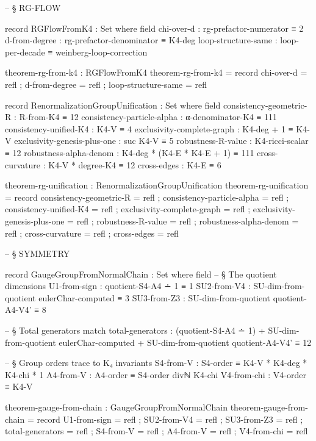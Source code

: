 \documentclass[11pt,a4paper]{book}
\begin{document}
\begin{code}
-- § RG-FLOW

record RGFlowFromK4 : Set where
  field
    chi-over-d           : rg-prefactor-numerator ≡ 2
    d-from-degree        : rg-prefactor-denominator ≡ K4-deg
    loop-structure-same  : loop-per-decade ≡ weinberg-loop-correction

theorem-rg-from-k4 : RGFlowFromK4
theorem-rg-from-k4 = record
  { chi-over-d          = refl
  ; d-from-degree       = refl
  ; loop-structure-same = refl
  }

record RenormalizationGroupUnification : Set where
  field
    consistency-geometric-R : R-from-K4 ≡ 12
    consistency-particle-alpha : α-denominator-K4 ≡ 111
    consistency-unified-K4 : K4-V ≡ 4
    exclusivity-complete-graph : K4-deg + 1 ≡ K4-V
    exclusivity-genesis-plus-one : suc K4-V ≡ 5
    robustness-R-value : K4-ricci-scalar ≡ 12
    robustness-alpha-denom : K4-deg * (K4-E * K4-E + 1) ≡ 111
    cross-curvature : K4-V * degree-K4 ≡ 12
    cross-edges : K4-E ≡ 6

theorem-rg-unification : RenormalizationGroupUnification
theorem-rg-unification = record
  { consistency-geometric-R = refl
  ; consistency-particle-alpha = refl
  ; consistency-unified-K4 = refl
  ; exclusivity-complete-graph = refl
  ; exclusivity-genesis-plus-one = refl
  ; robustness-R-value = refl
  ; robustness-alpha-denom = refl
  ; cross-curvature = refl
  ; cross-edges = refl
  }


-- § SYMMETRY

record GaugeGroupFromNormalChain : Set where
  field
    -- § The quotient dimensions
    U1-from-sign   : quotient-S4-A4 ∸ 1 ≡ 1
    SU2-from-V4    : SU-dim-from-quotient eulerChar-computed ≡ 3
    SU3-from-Z3    : SU-dim-from-quotient quotient-A4-V4' ≡ 8
    
    -- § Total generators match
    total-generators : (quotient-S4-A4 ∸ 1) 
                     + SU-dim-from-quotient eulerChar-computed 
                     + SU-dim-from-quotient quotient-A4-V4' ≡ 12
    
    -- § Group orders trace to K₄ invariants
    S4-from-V     : S4-order ≡ K4-V * K4-deg * K4-chi * 1
    A4-from-V     : A4-order ≡ S4-order divℕ K4-chi
    V4-from-chi   : V4-order ≡ K4-V

theorem-gauge-from-chain : GaugeGroupFromNormalChain
theorem-gauge-from-chain = record
  { U1-from-sign     = refl
  ; SU2-from-V4      = refl
  ; SU3-from-Z3      = refl
  ; total-generators  = refl
  ; S4-from-V        = refl
  ; A4-from-V        = refl
  ; V4-from-chi      = refl
  }



\end{code}
\end{document}
